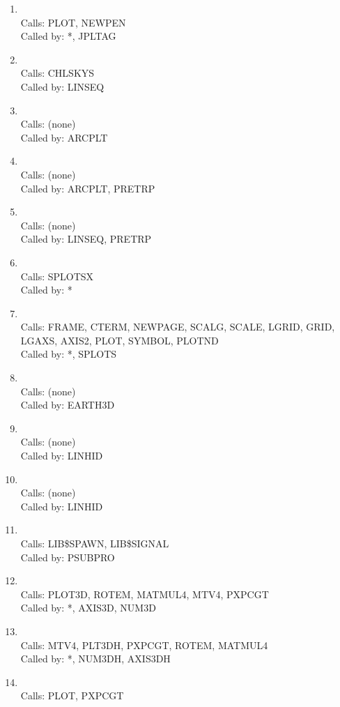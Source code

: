\documentclass[11pt]{report}
\begin{document}
\begin{enumerate}
\item {}
\\ Calls:  PLOT, NEWPEN
\\ Called by: *, JPLTAG
\item {}
\\ Calls:  CHLSKYS
\\ Called by: LINSEQ
\item {}
\\ Calls:  (none)
\\ Called by: ARCPLT
\item {}
\\ Calls:  (none)
\\ Called by: ARCPLT, PRETRP
\item {}
\\ Calls:  (none)
\\ Called by: LINSEQ, PRETRP
\item {}
\\ Calls:  SPLOTSX
\\ Called by: *
\item {}
\\ Calls:  FRAME, CTERM, NEWPAGE, SCALG, SCALE, LGRID, GRID,
LGAXS, AXIS2, PLOT, SYMBOL, PLOTND
\\ Called by: *, SPLOTS
\item {}
\\ Calls:  (none)
\\ Called by: EARTH3D
\item {}
\\ Calls:  (none)
\\ Called by: LINHID
\item {}
\\ Calls:  (none)
\\ Called by: LINHID
\item {}
\\ Calls:  LIB\$SPAWN, LIB\$SIGNAL
\\ Called by: PSUBPRO
\item {}
\\ Calls:  PLOT3D, ROTEM, MATMUL4, MTV4, PXPCGT
\\ Called by: *, AXIS3D, NUM3D
\item {}
\\ Calls:  MTV4, PLT3DH, PXPCGT, ROTEM, MATMUL4
\\ Called by: *, NUM3DH, AXIS3DH
\item {}
\\ Calls:  PLOT, PXPCGT

\end{enumerate}
\end{document}
